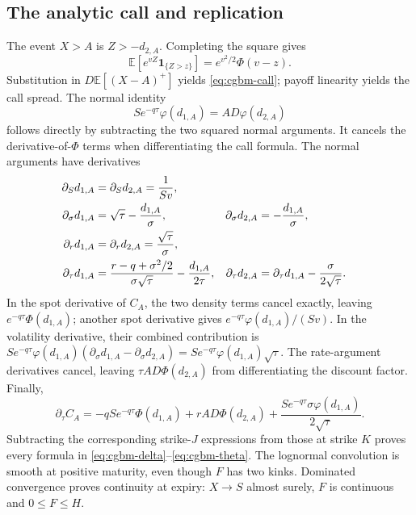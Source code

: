 \documentclass[11pt]{article}
\begin{document}
\subsection{The analytic call and replication}

The event $X>A$ is $Z>-d_{2,A}$. Completing the square gives
\begin{equation}
 \mathbb E[e^{vZ}\mathbf 1_{\{Z>z\}}]
 =e^{v^2/2}\Phi(v-z).
 \label{eq:cgbm-gaussian-tilt}
\end{equation}
Substitution in $D\mathbb E[(X-A)^+]$ yields
\eqref{eq:cgbm-call}; payoff linearity yields the call spread. The normal
identity
\begin{equation}
 S e^{-q\tau}\varphi(d_{1,A})=A D\varphi(d_{2,A})
 \label{eq:cgbm-density-identity}
\end{equation}
follows directly by subtracting the two squared normal arguments. It
cancels the derivative-of-$\Phi$ terms when differentiating the call
formula. The normal arguments have derivatives
\begin{align}
 \partial_S d_{1,A}&=\partial_S d_{2,A}=\frac1{Sv},\notag\\
 \partial_\sigma d_{1,A}&=\sqrt{\tau}-\frac{d_{1,A}}{\sigma},
 &\partial_\sigma d_{2,A}&=-\frac{d_{1,A}}{\sigma},\notag\\
 \partial_r d_{1,A}&=\partial_r d_{2,A}=\frac{\sqrt{\tau}}{\sigma},
 \label{eq:cgbm-d-derivatives}\\
 \partial_\tau d_{1,A}&=
 \frac{r-q+\sigma^2/2}{\sigma\sqrt{\tau}}
 -\frac{d_{1,A}}{2\tau},
 &\partial_\tau d_{2,A}&=\partial_\tau d_{1,A}
 -\frac{\sigma}{2\sqrt{\tau}}.
 \notag
\end{align}
In the spot derivative of $C_A$, the two density terms cancel exactly,
leaving $e^{-q\tau}\Phi(d_{1,A})$; another spot derivative gives
$e^{-q\tau}\varphi(d_{1,A})/(Sv)$. In the volatility derivative, their
combined contribution is
$S e^{-q\tau}\varphi(d_{1,A})
(\partial_\sigma d_{1,A}-\partial_\sigma d_{2,A})
=S e^{-q\tau}\varphi(d_{1,A})\sqrt{\tau}$.
The rate-argument derivatives cancel, leaving
$\tau A D\Phi(d_{2,A})$ from differentiating the discount factor.
Finally,
\begin{equation}
 \partial_\tau C_A=-q S e^{-q\tau}\Phi(d_{1,A})
 +r A D\Phi(d_{2,A})
 +\frac{S e^{-q\tau}\sigma\varphi(d_{1,A})}{2\sqrt{\tau}}.
 \label{eq:cgbm-call-time}
\end{equation}
Subtracting the corresponding strike-$J$ expressions from those at
strike $K$ proves every formula in
\eqref{eq:cgbm-delta}--\eqref{eq:cgbm-theta}.
The lognormal convolution is smooth at positive maturity, even though
$F$ has two kinks. Dominated convergence proves continuity at expiry:
$X\to S$ almost surely, $F$ is continuous and $0\leq F\leq H$.
\end{document}
